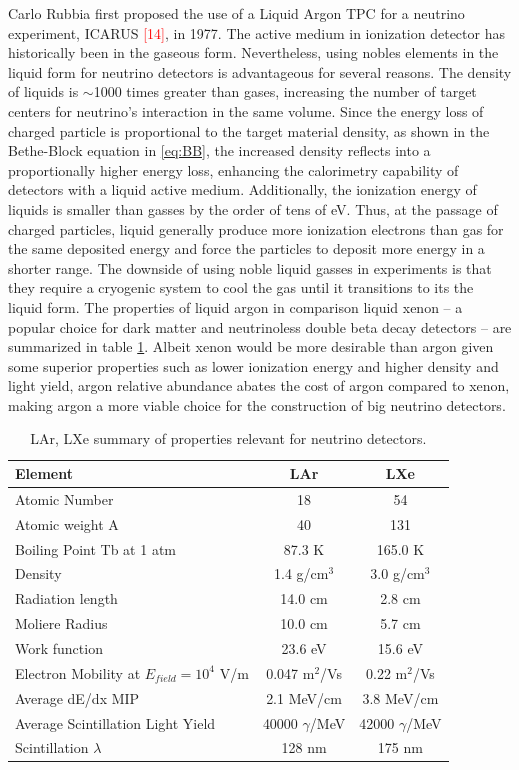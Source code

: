 Carlo Rubbia first proposed the use of a Liquid Argon TPC for a neutrino experiment, ICARUS \textcolor{red}{[14]}, in 1977. The active medium in ionization detector has historically been in the gaseous form. Nevertheless, using nobles elements in the liquid form for neutrino detectors is advantageous for several reasons.  The density of liquids is $\sim$1000 times greater than gases, increasing the number of target centers for neutrino's interaction in the same volume. Since the energy loss of charged particle is proportional to the target material density, as shown in the Bethe-Block equation in \ref{eq:BB}, the increased density reflects into a proportionally higher energy loss, enhancing the calorimetry capability of detectors with a liquid active medium. Additionally, the ionization energy of liquids is smaller than gasses by the order of tens of eV. Thus, at the passage of charged particles, liquid generally produce more ionization electrons than gas for the same deposited energy and force the particles to deposit more energy in a shorter range. The downside of using noble liquid gasses in experiments is that they require a cryogenic system to cool the gas until it transitions to its the liquid form.
The properties of liquid argon in comparison liquid xenon -- a popular choice for dark matter and neutrinoless double beta decay detectors -- are summarized in table \ref{tab:properties}.  Albeit xenon would be more desirable than argon given some superior properties such as lower ionization energy and higher density and light yield, argon relative abundance abates the cost of argon compared to xenon, making argon a more viable choice for the construction of big neutrino detectors. 




\begin{table}[]
\centering
\begin{tabular}{|l|c|c|}\hline
Element & LAr & LXe \\
\hline
\hline
Atomic Number &  18 &54 \\
Atomic weight A & 40  & 131\\
Boiling Point Tb at 1 atm & 87.3 K & 165.0 K\\
Density  & 1.4 g/cm$^3$& 3.0 g/cm$^3$\\
Radiation length  & 14.0 cm& 2.8 cm \\
Moliere Radius  &10.0 cm& 5.7 cm\\
Work function  & 23.6 eV&15.6 eV\\
Electron Mobility at $E_{field} =10^4$ V/m &0.047 m$^2$/Vs& 0.22 m$^2$/Vs\\
Average dE/dx MIP  & 2.1 MeV/cm&3.8 MeV/cm\\
Average Scintillation Light Yield & 40000 $\gamma$/MeV&42000 $\gamma$/MeV\\
Scintillation $\lambda$  &128 nm&175 nm\\
\hline
\end{tabular}
\caption{LAr, LXe summary of properties relevant for neutrino detectors.}
\label{tab:properties}
\end{table}


